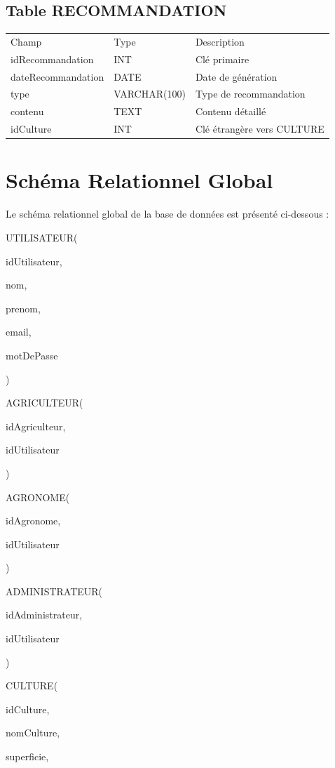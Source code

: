 \hypertarget{table-recommandation}{%
\subsection{Table RECOMMANDATION}\label{table-recommandation}}

\begin{longtable}[]{@{}lll@{}}
\toprule
\endhead
Champ & Type & Description \\
idRecommandation & INT & Clé primaire \\
dateRecommandation & DATE & Date de génération \\
type & VARCHAR(100) & Type de recommandation \\
contenu & TEXT & Contenu détaillé \\
idCulture & INT & Clé étrangère vers CULTURE \\
\bottomrule
\end{longtable}

\hypertarget{schuxe9ma-relationnel-global}{%
\section{Schéma Relationnel Global}\label{schuxe9ma-relationnel-global}}

Le schéma relationnel global de la base de données est présenté
ci-dessous :

UTILISATEUR(

idUtilisateur,

nom,

prenom,

email,

motDePasse

)

AGRICULTEUR(

idAgriculteur,

idUtilisateur

)

AGRONOME(

idAgronome,

idUtilisateur

)

ADMINISTRATEUR(

idAdministrateur,

idUtilisateur

)

CULTURE(

idCulture,

nomCulture,

superficie,


